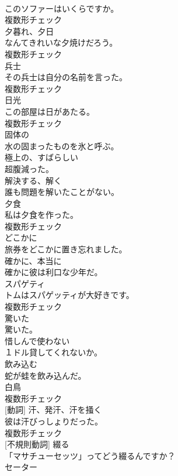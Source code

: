 \documentclass[8pt]{extreport}
\begin{document}
\begin{CJK}{UTF8}{min}
\\	このソファーはいくらですか。	
\\	複数形チェック
\\	[名詞]	夕暮れ、夕日	
\\	なんてきれいな夕焼けだろう。	
\\	複数形チェック
\\	[名詞]	兵士	
\\	その兵士は自分の名前を言った。	
\\	複数形チェック
\\	[名詞]	日光	
\\	この部屋は日があたる。	
\\	複数形チェック
\\	[形容詞]	固体の	
\\	水の固まったものを氷と呼ぶ。	
\\	[形容詞]	極上の、すばらしい	
\\	超腹減った。	
\\	[動詞]	解決する、解く	
\\	誰も問題を解いたことがない。	
\\	[名詞]	夕食	
\\	私は夕食を作った。	
\\	複数形チェック
\\	[副詞]	どこかに	
\\	旅券をどこかに置き忘れました。	
\\	[副詞]	確かに、本当に	
\\	確かに彼は利口な少年だ。	
\\	[名詞]	スパゲティ	
\\	トムはスパゲッティが大好きです。	
\\	複数形チェック
\\	[形容詞]	驚いた	
\\	驚いた。	
\\	[動詞]	惜しんで使わない	
\\	１ドル貸してくれないか。	
\\	[動詞]	飲み込む	
\\	蛇が蛙を飲み込んだ。	
\\	[名詞]	白鳥	
\\	複数形チェック
\\	[名詞] [動詞]	汗、発汗、汗を掻く	
\\	彼は汗びっしょりだった。	
\\	複数形チェック
\\	[動詞] [不規則動詞]	綴る	
\\	「マサチューセッツ」ってどう綴るんですか？	
\\	[名詞]	セーター	

\end{CJK}
\end{document}

